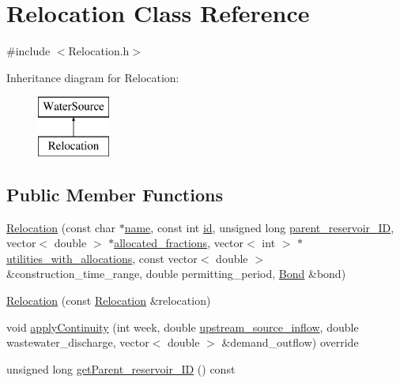 \hypertarget{classRelocation}{}\section{Relocation Class Reference}
\label{classRelocation}


{\ttfamily \#include $<$Relocation.\+h$>$}

Inheritance diagram for Relocation\+:\begin{figure}[H]
\begin{center}
\leavevmode
\includegraphics[height=2.000000cm]{classRelocation}
\end{center}
\end{figure}
\subsection*{Public Member Functions}
\begin{DoxyCompactItemize}
\item 
\mbox{\hyperlink{classRelocation_abeada1f0c797d8992c1e6a200b571574}{Relocation}} (const char $\ast$\mbox{\hyperlink{classWaterSource_a846ea74c5b453d014f594d41fee8c765}{name}}, const int \mbox{\hyperlink{classWaterSource_a6eafe5dfefd317877d1244e8a7c6e742}{id}}, unsigned long \mbox{\hyperlink{classRelocation_a61282254064f00641aaec667a7eb0652}{parent\+\_\+reservoir\+\_\+\+ID}}, vector$<$ double $>$ $\ast$\mbox{\hyperlink{classWaterSource_a2f6655a80c4847fe039987255d9d998c}{allocated\+\_\+fractions}}, vector$<$ int $>$ $\ast$\mbox{\hyperlink{classRelocation_ae426f390487b6b67f19bfbf556c922c2}{utilities\+\_\+with\+\_\+allocations}}, const vector$<$ double $>$ \&construction\+\_\+time\+\_\+range, double permitting\+\_\+period, \mbox{\hyperlink{classBond}{Bond}} \&bond)
\item 
\mbox{\hyperlink{classRelocation_a51eeb6a7d2b07940c2688b9b550145f0}{Relocation}} (const \mbox{\hyperlink{classRelocation}{Relocation}} \&relocation)
\item 
void \mbox{\hyperlink{classRelocation_af5c795c7b331b86b31c8bfa2ef9b6fe5}{apply\+Continuity}} (int week, double \mbox{\hyperlink{classWaterSource_a7a69b2e9b6030f1035e6cf44d2918ee5}{upstream\+\_\+source\+\_\+inflow}}, double wastewater\+\_\+discharge, vector$<$ double $>$ \&demand\+\_\+outflow) override
\item 
unsigned long \mbox{\hyperlink{classRelocation_ae04b94d64c0ffd9a14dcdafdea551988}{get\+Parent\+\_\+reservoir\+\_\+\+ID}} () const
\end{DoxyCompactItemize}

